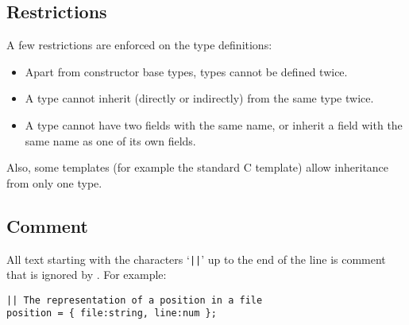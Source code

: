 \subsection{Restrictions}
A few restrictions are enforced on the type definitions:
\begin{itemize}
\item Apart from constructor base types, types cannot be defined twice.
\item A type cannot inherit (directly or indirectly) from the same type
twice.
\item A type cannot have two fields with the same name, or inherit
a field with the same name as one of its own fields.
\end{itemize}
\par
Also, some templates (for example the standard C template) allow inheritance
from only one type.
\subsection{Comment}
All text starting with the characters `{\tt ||}' up to the end of the line
is comment that is ignored by {\Tm}.
For example:
\begin{showfile}
\begin{verbatim}
|| The representation of a position in a file
position = { file:string, line:num };
\end{verbatim}
\end{showfile}

